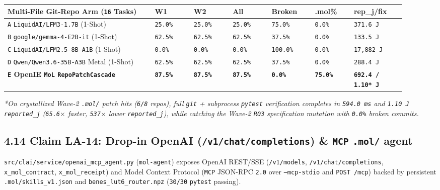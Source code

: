 \documentclass[10pt]{article}
\begin{document}
{\footnotesize\setlength{\tabcolsep}{3pt}
\begin{longtable}{@{}L{0.34\linewidth}C{0.09\linewidth}C{0.09\linewidth}C{0.09\linewidth}C{0.10\linewidth}C{0.09\linewidth}C{0.12\linewidth}@{}}
\toprule
\textbf{Multi-File Git-Repo Arm (\texttt{16} Tasks)} & \textbf{W1} & \textbf{W2} & \textbf{All} & \textbf{Broken} & \textbf{.mol\%} & \textbf{rep\_j/fix} \\
\midrule
\endhead
\texttt{A} \texttt{LiquidAI/LFM3-1.7B} (1-Shot) & \texttt{25.0\%} & \texttt{25.0\%} & \texttt{25.0\%} & \texttt{75.0\%} & \texttt{0.0\%} & \texttt{371.6 J} \\
\texttt{B} \texttt{google/gemma-4-E2B-it} (1-Shot) & \texttt{62.5\%} & \texttt{62.5\%} & \texttt{62.5\%} & \texttt{37.5\%} & \texttt{0.0\%} & \texttt{133.5 J} \\
\texttt{C} \texttt{LiquidAI/LFM2.5-8B-A1B} (1-Shot) & \texttt{0.0\%} & \texttt{0.0\%} & \texttt{0.0\%} & \texttt{100.0\%} & \texttt{0.0\%} & \texttt{17,882 J} \\
\texttt{D} \texttt{Qwen/Qwen3.6-35B-A3B} Metal (1-Shot) & \texttt{62.5\%} & \texttt{62.5\%} & \texttt{62.5\%} & \texttt{37.5\%} & \texttt{0.0\%} & \texttt{288.4 J} \\
\textbf{\texttt{E} OpenIE \texttt{MoL} \texttt{RepoPatchCascade}} & \textbf{\texttt{87.5\%}} & \textbf{\texttt{87.5\%}} & \textbf{\texttt{87.5\%}} & \textbf{\texttt{0.0\%}} & \textbf{\texttt{75.0\%}} & \textbf{\texttt{692.4 / 1.10* J}} \\
\bottomrule
\end{longtable}
}

\emph{*On crystallized Wave-2 \texttt{.mol/} patch hits (\texttt{6/8} repos), full \texttt{git} + subprocess \texttt{pytest} verification completes in \texttt{594.0 ms} and \texttt{1.10 J} \texttt{reported\_j} (\texttt{65.6$\times$} faster, \texttt{537$\times$} lower \texttt{reported\_j}), while catching the Wave-2 \texttt{R03} specification mutation with \texttt{0.0\%} broken commits.}

\subsection{4.14 Claim LA-14: Drop-in OpenAI (\texttt{/v1/chat/completions}) \& \texttt{MCP} \texttt{.mol/} agent}\label{claim-la14}

\texttt{src/clai/service/openai\_mcp\_agent.py} (\texttt{mol-agent}) exposes OpenAI REST/SSE (\texttt{/v1/models}, \texttt{/v1/chat/completions}, \texttt{x\_mol\_contract}, \texttt{x\_mol\_receipt}) and Model Context Protocol (\texttt{MCP} JSON-RPC \texttt{2.0} over \texttt{--mcp-stdio} and \texttt{POST /mcp}) backed by persistent \texttt{.mol/skills\_v1.json} and \texttt{benes\_lut6\_router.npz} (\texttt{30/30} \texttt{pytest} passing).
\end{document}
